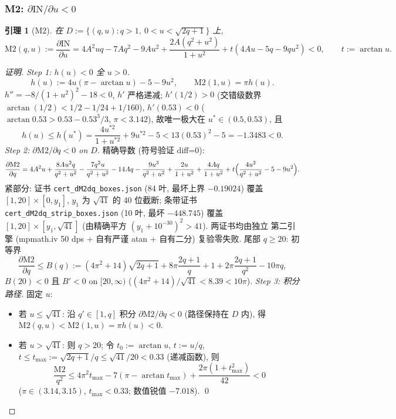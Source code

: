 \documentclass[UTF8]{ctexart}
\newtheorem{lemma}[theorem]{引理}
\begin{document}
\subsubsection{M2: \texorpdfstring{$\partial\mathrm{IN}/\partial u<0$}{dIN/du < 0}}
\begin{lemma}[M2]
\label{lem:m2}
在 $D:=\{(q,u):q>1,\ 0<u<\sqrt{2q+1}\}$ 上,
\begin{equation}
	\mathrm{M2}(q,u):=\frac{\partial\mathrm{IN}}{\partial u}
	=4A^2uq-7Aq^2-9Au^2+\frac{2A(q^2+u^2)}{1+u^2}+t(4Au-5q-9qu^2)<0,
	\qquad t:=\arctan u.
\end{equation}
\end{lemma}
\begin{proof}[证明]
\emph{Step 1: $h(u)<0$ 全 $u>0$.}
\begin{equation}
	h(u):=4u(\pi-\arctan u)-5-9u^2,\qquad
	\mathrm{M2}(1,u)=\pi h(u).
\end{equation}
$h''=-8/(1+u^2)^2-18<0$, $h'$ 严格递减; $h'(1/2)>0$ (交错级数界
$\arctan(1/2)<1/2-1/24+1/160$), $h'(0.53)<0$ ($\arctan0.53>0.53-0.53^3/3$,
$\pi<3.142$), 故唯一极大在 $u^*\in(0.5,0.53)$, 且
\begin{equation}
	h(u)\le h(u^*)=\frac{4u^{*2}}{1+u^{*2}}+9u^{*2}-5<13(0.53)^2-5=-1.3483<0.
\end{equation}
\emph{Step 2: $\partial\mathrm{M2}/\partial q<0$ on $D$.} 精确导数 (符号验证 diff=0):
\begin{equation}
	\frac{\partial\mathrm{M2}}{\partial q}
	=4A^2u+\frac{8Au^2q}{q^2+u^2}-\frac{7q^2u}{q^2+u^2}-14Aq-\frac{9u^3}{q^2+u^2}
	+\frac{2u}{1+u^2}+\frac{4Aq}{1+u^2}+t\Bigl(\frac{4u^2}{q^2+u^2}-5-9u^2\Bigr).
\end{equation}
紧部分: 证书 \texttt{cert\_dM2dq\_boxes.json} (84 叶, 最坏上界 $-0.19024$) 覆盖
$[1,20]\times[0,y_1]$, $y_1$ 为 $\sqrt{41}$ 的 40 位截断; 条带证书
\texttt{cert\_dM2dq\_strip\_boxes.json} (10 叶, 最坏 $-448.745$) 覆盖
$[1,20]\times[y_1,\sqrt{41}]$ (由精确平方 $(y_1+10^{-30})^2>41$). 两证书均由独立
第二引擎 (mpmath.iv 50 dps + 自有严谨 atan + 自有二分) 复验零失败.
尾部 $q\ge20$: 初等界
\begin{equation}
	\frac{\partial\mathrm{M2}}{\partial q}\le
	B(q):=(4\pi^2+14)\sqrt{2q+1}+8\pi\frac{2q+1}{q}+1+2\pi\frac{2q+1}{q^2}-10\pi q,
\end{equation}
$B(20)<0$ 且 $B'<0$ on $[20,\infty)$ ($(4\pi^2+14)/\sqrt{41}<8.39<10\pi$).
\emph{Step 3: 积分路径.} 固定 $u$:
\begin{itemize}
	\item 若 $u\le\sqrt{41}$: 沿 $q'\in[1,q]$ 积分 $\partial\mathrm{M2}/\partial q<0$
	(路径保持在 $D$ 内), 得 $\mathrm{M2}(q,u)<\mathrm{M2}(1,u)=\pi h(u)<0$.
	\item 若 $u>\sqrt{41}$: 则 $q>20$; 令 $t_0:=\arctan u$, $t:=u/q$,
	$t\le t_{\max}:=\sqrt{2q+1}/q\le\sqrt{41}/20<0.33$ (递减函数), 则
	\begin{equation}
		\frac{\mathrm{M2}}{q^2}\le
		4\pi^2t_{\max}-7(\pi-\arctan t_{\max})+\frac{2\pi(1+t_{\max}^2)}{42}<0
	\end{equation}
	($\pi\in(3.14,3.15)$, $t_{\max}<0.33$; 数值锐值 $-7.018$). \qed
	\end{itemize}
\end{proof}
\end{document}
